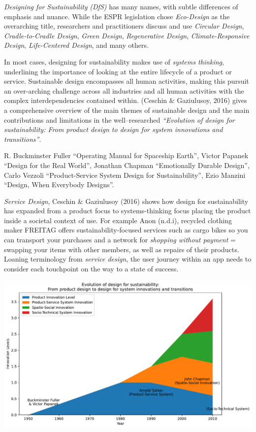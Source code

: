 \documentclass[
  letterpaper,
  DIV=11,
  numbers=noendperiod]{scrartcl}
\begin{document}
\emph{Designing for Sustainability} \emph{(DfS)} has many names, with
subtle differences of emphasis and nuance. While the ESPR legislation
chose \emph{Eco-Design} as the overarching title, researchers and
practitioners discuss and use \emph{Circular Design},
\emph{Cradle-to-Cradle Design}, \emph{Green Design}, \emph{Regenerative
Design}, \emph{Climate-Responsive Design}, \emph{Life-Centered Design},
and many others.

In most cases, designing for sustainability makes use of \emph{systems
thinking}, underlining the importance of looking at the entire lifecycle
of a product or service. Sustainable design encompasses all human
activities, making this pursuit an over-arching challenge across all
industries and all human activities with the complex interdependencies
contained within. (Ceschin \& Gaziulusoy, 2016) gives a comprehensive
overview of the main themes of sustainable design and the main
contributions and limitations in the well--researched \emph{``Evolution
of design for sustainability: From product design to design for system
innovations and transitions''}.

R. Buckminster Fuller ``Operating Manual for Spaceship Earth'', Victor
Papanek ``Design for the Real World'', Jonathan Chapman ``Emotionally
Durable Design'', Carlo Vezzoli ``Product-Service System Design for
Sustainability'', Ezio Manzini ``Design, When Everybody Designs''.

\emph{Service Design}, Ceschin \& Gaziulusoy (2016) shows how design for
sustainability has expanded from a product focus to systems-thinking
focus placing the product inside a societal context of use. For example
Anon (n.d.i), recycled clothing maker FREITAG offers
sustainability-focused services such as cargo bikes so you can transport
your purchases and a network for \emph{shopping without payment} =
swapping your items with other members, as well as repairs of their
products. Loaning terminology from \emph{service design}, the user
journey within an app needs to consider each touchpoint on the way to a
state of success.

\includegraphics{_thesis_files/figure-pdf/cell-25-output-1.pdf}
\end{document}
